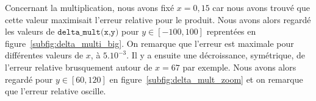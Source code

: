 \documentclass{article}
\begin{document}
Concernant la multiplication, nous avons fixé $x = 0,15$ car nous avons trouvé que cette valeur maximisait l'erreur relative pour le produit. Nous avons alors regardé les valeurs de $\texttt{delta\_mult(x,y)}$ pour $y\in[-100,100]$ reprentées en figure~\ref{subfig:delta_multi_big}. On remarque que l'erreur est maximale pour différentes valeurs de $x$, à $5.10^{-3}$. Il y a ensuite une décroissance, symétrique, de l'erreur relative brusquement autour de $x = 67$ par exemple. Nous avons alors regardé pour $y\in[60,120]$ en figure~\ref{subfig:delta_mult_zoom} et on remarque que l'erreur relative oscille.
 



  




  
 



  




  
 



  
\end{document}
